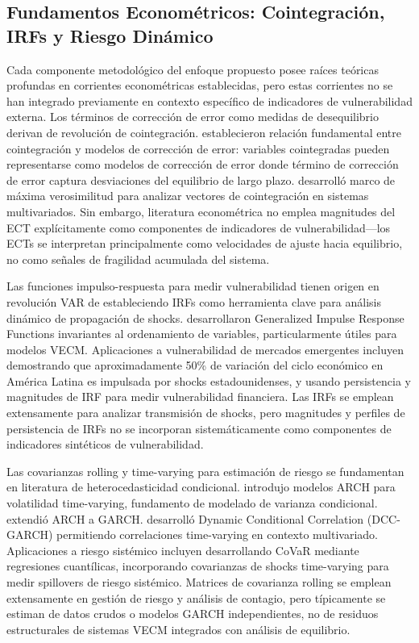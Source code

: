 \documentclass[3p,11pt,draft,natbib=false]{elsarticle}
\begin{document}
\subsection{Fundamentos Econométricos: Cointegración, IRFs y Riesgo Dinámico}

Cada componente metodológico del enfoque propuesto posee raíces teóricas profundas en corrientes econométricas establecidas, pero estas corrientes no se han integrado previamente en contexto específico de indicadores de vulnerabilidad externa. Los términos de corrección de error como medidas de desequilibrio derivan de revolución de cointegración. \citet{engle1987cointegration} establecieron relación fundamental entre cointegración y modelos de corrección de error: variables cointegradas pueden representarse como modelos de corrección de error donde término de corrección de error captura desviaciones del equilibrio de largo plazo. \citet{johansen1988statistical,johansen1991estimation} desarrolló marco de máxima verosimilitud para analizar vectores de cointegración en sistemas multivariados. Sin embargo, literatura econométrica no emplea magnitudes del ECT explícitamente como componentes de indicadores de vulnerabilidad—los ECTs se interpretan principalmente como velocidades de ajuste hacia equilibrio, no como señales de fragilidad acumulada del sistema.

Las funciones impulso-respuesta para medir vulnerabilidad tienen origen en revolución VAR de \citet{sims1980macroeconomics} estableciendo IRFs como herramienta clave para análisis dinámico de propagación de shocks. \citet{pesaran1998generalized} desarrollaron Generalized Impulse Response Functions invariantes al ordenamiento de variables, particularmente útiles para modelos VECM. Aplicaciones a vulnerabilidad de mercados emergentes incluyen \citet{canova2005transmission} demostrando que aproximadamente 50\% de variación del ciclo económico en América Latina es impulsada por shocks estadounidenses, y \citet{rey2015dilemma} usando persistencia y magnitudes de IRF para medir vulnerabilidad financiera. Las IRFs se emplean extensamente para analizar transmisión de shocks, pero magnitudes y perfiles de persistencia de IRFs no se incorporan sistemáticamente como componentes de indicadores sintéticos de vulnerabilidad.

Las covarianzas rolling y time-varying para estimación de riesgo se fundamentan en literatura de heterocedasticidad condicional. \citet{engle1982autoregressive} introdujo modelos ARCH para volatilidad time-varying, fundamento de modelado de varianza condicional. \citet{bollerslev1986generalized} extendió ARCH a GARCH. \citet{engle2002dynamic} desarrolló Dynamic Conditional Correlation (DCC-GARCH) permitiendo correlaciones time-varying en contexto multivariado. Aplicaciones a riesgo sistémico incluyen \citet{adrian2016covar} desarrollando CoVaR mediante regresiones cuantílicas, incorporando covarianzas de shocks time-varying para medir spillovers de riesgo sistémico. Matrices de covarianza rolling se emplean extensamente en gestión de riesgo y análisis de contagio, pero típicamente se estiman de datos crudos o modelos GARCH independientes, no de residuos estructurales de sistemas VECM integrados con análisis de equilibrio.
\end{document}
